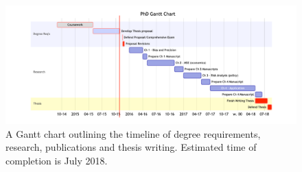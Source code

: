 \documentclass[]{scrartcl}
\begin{document}
\newpage

\begin{figure}[htbp]
\centering
\includegraphics{figures/gantt.pdf}
\caption{A Gantt chart outlining the timeline of degree requirements, research, publications and thesis writing. Estimated time of completion is July 2018.}\label{fig:gantt}
\end{figure}
\end{document}
